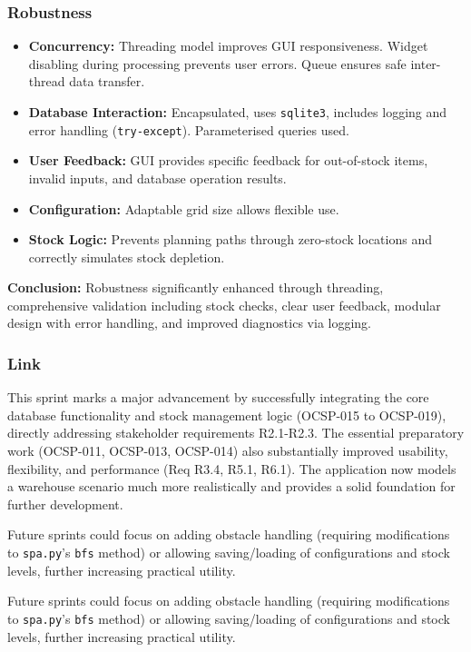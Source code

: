 \subsubsection{Robustness}
\begin{itemize}
	\item \textbf{Concurrency:} Threading model improves GUI responsiveness. Widget disabling during processing prevents user errors. Queue ensures safe inter-thread data transfer.
	\item \textbf{Database Interaction:} Encapsulated, uses \verb|sqlite3|, includes logging and error handling (\verb|try-except|). Parameterised queries used.
	\item \textbf{User Feedback:} GUI provides specific feedback for out-of-stock items, invalid inputs, and database operation results.
	\item \textbf{Configuration:} Adaptable grid size allows flexible use.
	\item \textbf{Stock Logic:} Prevents planning paths through zero-stock locations and correctly simulates stock depletion.
\end{itemize}
\textbf{Conclusion:} Robustness significantly enhanced through threading, comprehensive validation including stock checks, clear user feedback, modular design with error handling, and improved diagnostics via logging.

\subsubsection{Link}
This sprint marks a major advancement by successfully integrating the core database functionality and stock management logic (OCSP-015 to OCSP-019), directly addressing stakeholder requirements R2.1-R2.3. The essential preparatory work (OCSP-011, OCSP-013, OCSP-014) also substantially improved usability, flexibility, and performance (Req R3.4, R5.1, R6.1). The application now models a warehouse scenario much more realistically and provides a solid foundation for further development.

Future sprints could focus on adding obstacle handling (requiring modifications to \verb|spa.py|'s \verb|bfs| method) or allowing saving/loading of configurations and stock levels, further increasing practical utility.

Future sprints could focus on adding obstacle handling (requiring modifications to \verb|spa.py|'s \verb|bfs| method) or allowing saving/loading of configurations and stock levels, further increasing practical utility.

